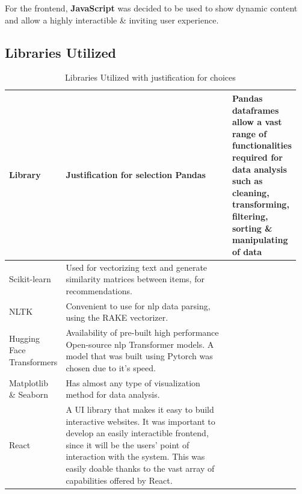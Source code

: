 For the frontend, \textbf{JavaScript} was decided to be used to show dynamic content and allow a highly interactible \& inviting user experience.

\subsection{Libraries Utilized}
\vspace{-4mm}
\begin{longtable}{|p{0.16\linewidth}|p{0.8\linewidth}|}
\caption{Libraries Utilized with justification for choices}\\ 
\hline
\textbf{Library} & \textbf{Justification for selection}\endfirsthead 
\hline
Pandas & Pandas dataframes allow a vast range of functionalities required for data analysis such as cleaning, transforming, filtering, sorting \& manipulating of data \\
\hline
Scikit-learn & Used for vectorizing text and generate similarity matrices between items, for recommendations. \\
\hline
NLTK & Convenient to use for \gls{nlp} data parsing, using the RAKE vectorizer. \\
\hline
Hugging Face Transformers & Availability of pre-built high performance Open-source \gls{nlp} Transformer models. A model that was built using Pytorch was chosen due to it's speed. \\
\hline
Matplotlib \& Seaborn & Has almost any type of visualization method for data analysis. \\
\hline
React & A UI library that makes it easy to build interactive websites. 
It was important to develop an easily interactible frontend, since it will be the users’ point of interaction with the system. This was easily doable thanks to the vast array of capabilities offered by React. \\
\hline
\end{longtable}

